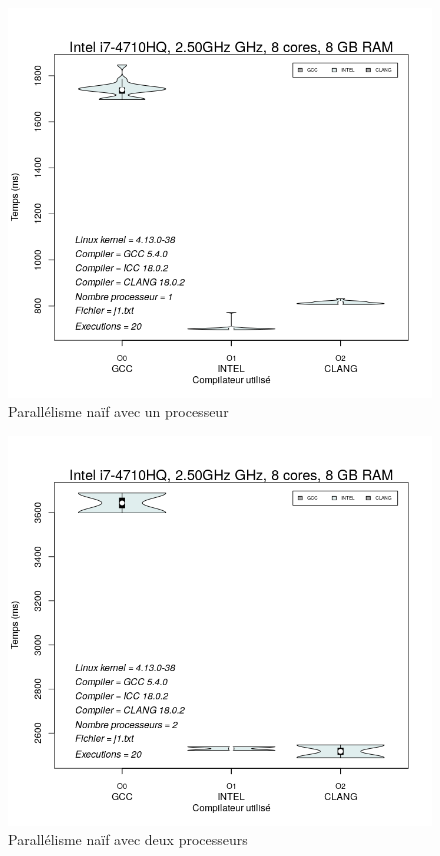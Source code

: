 \documentclass[
 aip,
 jmp,
 amsmath,amssymb,
 reprint
]{revtex4-1}
\begin{document}
\begin{figure}[H]
  \caption{Parallélisme naïf avec un processeur}
  \includegraphics[width=\linewidth, keepaspectratio=true]{naif_1.png}
\end{figure}

\begin{figure}[H]
  \caption{Parallélisme naïf avec deux processeurs}
  \includegraphics[width=\linewidth, keepaspectratio=true]{naif_2.png}
\end{figure}
\end{document}
